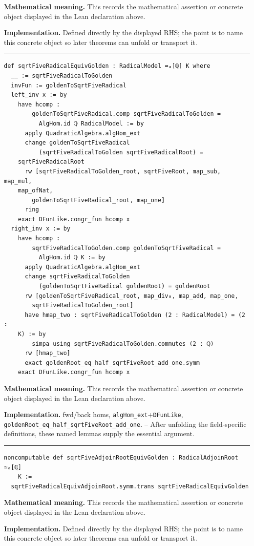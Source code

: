 \documentclass[UTF8,a4paper,11pt,fontset=fandol]{ctexart}
\theoremstyle{definition}
\newcommand{\statementsep}{\par\medskip\hrule\medskip}
\begin{document}
\noindent\textbf{Mathematical meaning.} This records the mathematical assertion or concrete object displayed in the Lean declaration above.\par
\noindent\textbf{Implementation.} Defined directly by the displayed RHS; the point is to name this concrete object so later theorems can unfold or transport it.\par
\statementsep
\begin{verbatim}
def sqrtFiveRadicalEquivGolden : RadicalModel ≃ₐ[ℚ] K where
  __ := sqrtFiveRadicalToGolden
  invFun := goldenToSqrtFiveRadical
  left_inv x := by
    have hcomp :
        goldenToSqrtFiveRadical.comp sqrtFiveRadicalToGolden =
          AlgHom.id ℚ RadicalModel := by
      apply QuadraticAlgebra.algHom_ext
      change goldenToSqrtFiveRadical
          (sqrtFiveRadicalToGolden sqrtFiveRadicalRoot) =
    sqrtFiveRadicalRoot
      rw [sqrtFiveRadicalToGolden_root, sqrtFiveRoot, map_sub, map_mul,
    map_ofNat,
        goldenToSqrtFiveRadical_root, map_one]
      ring
    exact DFunLike.congr_fun hcomp x
  right_inv x := by
    have hcomp :
        sqrtFiveRadicalToGolden.comp goldenToSqrtFiveRadical =
          AlgHom.id ℚ K := by
      apply QuadraticAlgebra.algHom_ext
      change sqrtFiveRadicalToGolden
          (goldenToSqrtFiveRadical goldenRoot) = goldenRoot
      rw [goldenToSqrtFiveRadical_root, map_div₀, map_add, map_one,
        sqrtFiveRadicalToGolden_root]
      have hmap_two : sqrtFiveRadicalToGolden (2 : RadicalModel) = (2 :
    K) := by
        simpa using sqrtFiveRadicalToGolden.commutes (2 : ℚ)
      rw [hmap_two]
      exact goldenRoot_eq_half_sqrtFiveRoot_add_one.symm
    exact DFunLike.congr_fun hcomp x
\end{verbatim}
\noindent\textbf{Mathematical meaning.} This records the mathematical assertion or concrete object displayed in the Lean declaration above.\par
\noindent\textbf{Implementation.} fwd/back homs, \texttt{algHom\_\allowbreak{}ext}+\texttt{DFunLike}, \texttt{goldenRoot\_\allowbreak{}eq\_\allowbreak{}half\_\allowbreak{}sqrtFiveRoot\_\allowbreak{}add\_\allowbreak{}one}. -- After unfolding the field-specific definitions, these named lemmas supply the essential argument.\par
\statementsep
\begin{verbatim}
noncomputable def sqrtFiveAdjoinRootEquivGolden : RadicalAdjoinRoot ≃ₐ[ℚ]
    K :=
  sqrtFiveRadicalEquivAdjoinRoot.symm.trans sqrtFiveRadicalEquivGolden
\end{verbatim}
\noindent\textbf{Mathematical meaning.} This records the mathematical assertion or concrete object displayed in the Lean declaration above.\par
\noindent\textbf{Implementation.} Defined directly by the displayed RHS; the point is to name this concrete object so later theorems can unfold or transport it.\par
\end{document}
